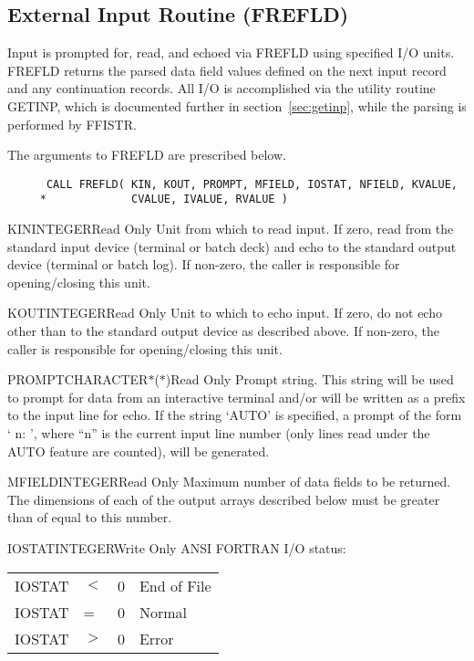 \subsection{External Input Routine (FREFLD)}\label{sec:frefld}

Input is prompted for, read, and echoed via FREFLD
using specified I/O units.  FREFLD returns the parsed data field values
defined on the next input record and any continuation records.  All I/O is
accomplished via the utility routine GETINP, which is documented further in
section~\ref{sec:getinp}, while the parsing is performed by FFISTR.

The arguments to FREFLD are prescribed below.
\begin{verbatim}
      CALL FREFLD( KIN, KOUT, PROMPT, MFIELD, IOSTAT, NFIELD, KVALUE,
     *             CVALUE, IVALUE, RVALUE )
\end{verbatim}

\begin{argy}{KIN}{INTEGER}{Read Only}
Unit from which to read input.  If zero, read from the
standard input device (terminal or batch deck) and echo
to the standard output device (terminal or batch log).
If non-zero, the caller is responsible for opening/closing this unit.
\end{argy}

\begin{argy}{KOUT}{INTEGER}{Read Only}
Unit to which to echo input.  If zero, do not echo other
than to the standard output device as described above.
If non-zero, the caller is responsible for opening/closing this unit.
\end{argy}

\begin{argy}{PROMPT}{CHARACTER$*$($*$)}{Read Only}
Prompt string.  This string will be used to prompt for
data from an interactive terminal and/or will be written
as a prefix to the input line for echo.  If the string
`AUTO' is specified, a prompt of the form `   n: ',
where ``n'' is the current input line number (only lines
read under the AUTO feature are counted), will be
generated.
\end{argy}

\begin{argy}{MFIELD}{INTEGER}{Read Only}
Maximum number of data fields to be returned.
The dimensions of each of the output
arrays described below must be greater than of equal to this number.
\end{argy}

\begin{argy}{IOSTAT}{INTEGER}{Write Only}
ANSI FORTRAN I/O status:\\
\begin{tabular}{llll}
IOSTAT &$<$ & 0 & End of File\\
IOSTAT & =  & 0 & Normal\\
IOSTAT &$>$ & 0 & Error
\end{tabular}
\end{argy}


